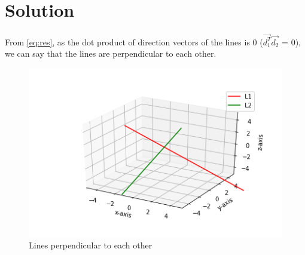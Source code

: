 \documentclass[journal,12pt,twocolumn]{IEEEtran}
\begin{document}
\section{Solution}

From \eqref{eq:res}, as the dot product of direction vectors of the lines is 0 ($\vec{d_1^T}\vec{d_2}$ = 0), we can say that the lines are perpendicular to each other.

\renewcommand{\thefigure}{\arabic{figure}}
\begin{figure}[h!]
	\centering
	\includegraphics[width=\columnwidth]{lines.png}
	\caption{Lines perpendicular to each other}
	\label{myfig}
\end{figure}\\
\\
\end{document}
